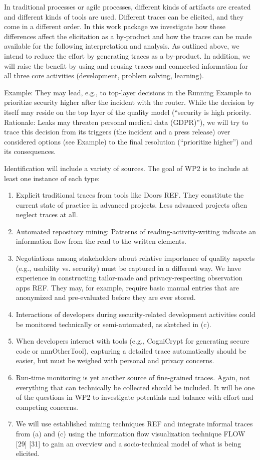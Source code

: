 In traditional processes or agile processes, different kinds of artifacts are created and different kinds of tools are used. Different traces can be elicited, and they come in a different order. In this work package we investigate how these differences affect the elicitation as a by-product and how the traces can be made available for the following interpretation and analysis. As outlined above, we intend to reduce the effort by generating traces as a by-product. In addition, we will raise the benefit by using and reusing traces and connected information for all three core activities (development, problem solving, learning).

Example: They may lead, e.g., to top-layer decisions in the Running Example to prioritize security higher after the incident with the router. While the decision by itself may reside on the top layer of the quality model (“security is high priority. Rationale: Leaks may threaten personal medical data (GDPR)”), we will try to trace this decision from its triggers (the incident and a press release) over considered options (see Example) to the final resolution (“prioritize higher”) and its consequences.

Identification will include a variety of sources. The goal of WP2 is to include at least one instance of each type:
\begin{enumerate}
\item Explicit traditional traces from tools like Doors REF. They constitute the current state of practice in advanced projects. Less advanced projects often neglect traces at all.
\item  Automated repository mining: Patterns of reading-activity-writing indicate an information flow from the read to the written elements. 
\item  Negotiations among stakeholders about relative importance of quality aspects (e.g., usability vs. security) must be captured in a different way. We have experience in constructing tailor-made and privacy-respecting observation apps REF. They may, for example, require basic manual entries that are anonymized and pre-evaluated before they are ever stored.
\item  Interactions of developers during security-related development activities could be monitored technically or semi-automated, as sketched in (c).
\item  When developers interact with tools (e.g., CogniCrypt for generating secure code or nnnOtherTool), capturing a detailed trace automatically should be easier, but must be weighed with personal and privacy concerns.
\item  Run-time monitoring is yet another source of fine-grained traces. Again, not everything that can technically be collected should be included. It will be one of the questions in WP2 to investigate potentials and balance with effort and competing concerns.
\item  We will use established mining techniques REF and integrate informal traces from (a) and (c) using the information flow visualization technique FLOW [29] [31] to gain an overview and a socio-technical model of what is being elicited.
\end{enumerate}

